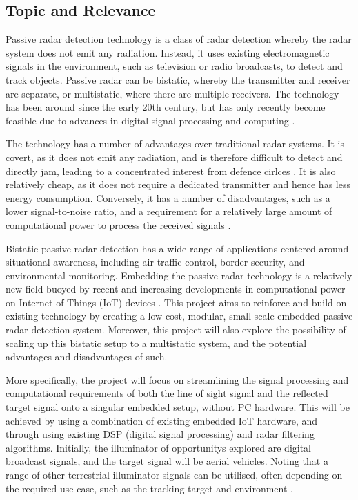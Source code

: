 \documentclass[12pt,a4paper]{article}
\begin{document}
\subsection{Topic and Relevance}
Passive radar detection technology is a class of radar detection whereby the radar system does not emit any radiation. Instead, it uses existing electromagnetic signals in the environment, such as television or radio broadcasts, to detect and track objects. Passive radar can be bistatic, whereby the transmitter and receiver are separate, or multistatic, where there are multiple receivers. The technology has been around since the early 20th century, but has only recently become feasible due to advances in digital signal processing and computing \cite{INTRO2017}.
\par
\vspace{0.5cm} 
\noindent The technology has a number of advantages over traditional radar systems. It is covert, as it does not emit any radiation, and is therefore difficult to detect and directly jam, leading to a concentrated interest from defence cirlces \cite{DTSO2009}. It is also relatively cheap, as it does not require a dedicated transmitter and hence has less energy consumption. Conversely, it has a number of disadvantages, such as a lower signal-to-noise ratio, and a requirement for a relatively large amount of computational power to process the received signals \cite{INTRO2017}.
\par
\vspace{0.5cm} 
\noindent Bistatic passive radar detection has a wide range of applications centered around situational awareness, including air traffic control, border security, and environmental monitoring. Embedding the passive radar technology is a relatively new field buoyed by recent and increasing developments in computational power on Internet of Things (IoT) devices \cite{IOTpassiveRadar}. This project aims to reinforce and build on existing technology by creating a low-cost, modular, small-scale embedded passive radar detection system. Moreover, this project will also explore the possibility of scaling up this bistatic setup to a multistatic system, and the potential advantages and disadvantages of such. 

\par
\vspace{0.5cm} 
\noindent More specifically, the project will focus on streamlining the signal processing and computational requirements of both the line of sight signal and the reflected target signal onto a singular embedded setup, without PC hardware. This will be achieved by using a combination of existing embedded IoT hardware, and through using existing DSP (digital signal processing) and radar filtering algorithms. Initially, the illuminator of opportunitys explored are digital broadcast signals, and the target signal will be aerial vehicles. Noting that a range of other terrestrial illuminator signals can be utilised, often depending on the required use case, such as the tracking target and environment \cite{DABsignal}.
\end{document}
